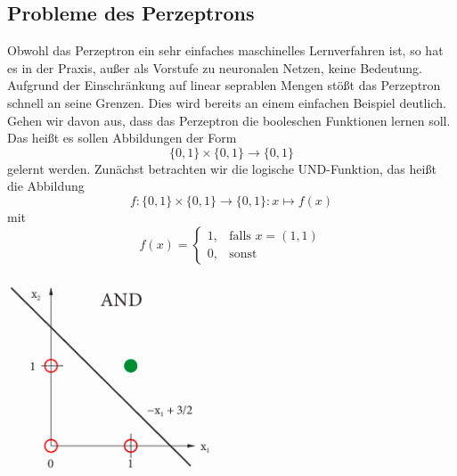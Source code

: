 \documentclass[a4paper]{scrartcl}
\newenvironment{Figure}
  {\par\medskip\noindent\minipage{\linewidth}}
  {\endminipage\par\medskip}
\begin{document}
\begin{multicols}{2}
                \subsection{Probleme des Perzeptrons}
                        Obwohl das Perzeptron ein sehr einfaches maschinelles Lernverfahren ist, so hat es in der Praxis, außer als Vorstufe zu neuronalen Netzen, keine Bedeutung. Aufgrund der Einschränkung auf linear seprablen Mengen stößt das Perzeptron schnell an seine Grenzen.
                        Dies wird bereits an einem einfachen Beispiel deutlich.
                        \newline
                        Gehen wir davon aus, dass das Perzeptron die booleschen Funktionen lernen soll. Das heißt es sollen Abbildungen der Form $$\{0,1\}\times\{0,1\} \rightarrow \{0,1\}$$ gelernt werden.
                        Zunächst betrachten wir die logische UND-Funktion, das heißt die Abbildung
                        $$
                            f:\{0,1\}\times\{0,1\}\rightarrow\{0,1\}: x\mapsto f(x)
                        $$
                        mit
                        $$
                            f(x)=\left\{\begin{array}{cl} 1, & \mbox{falls }x=(1,1)\\
                            0, & \mbox{sonst}\end{array}\right. 
                        $$
                        \begin{Figure}
                            \centering
                            \includegraphics[width=\linewidth]{AND.png}

\end{Figure}
\end{multicols}
\end{document}
